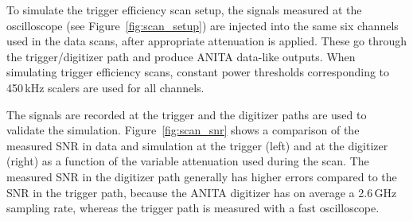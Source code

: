 
To simulate the trigger efficiency scan setup, the signals
measured at the oscilloscope (see Figure~\ref{fig:scan_setup}) are
injected into the same six channels used in the data scans, after
appropriate attenuation is applied.
These go through the trigger/digitizer path and produce ANITA
data-like outputs.
When simulating trigger efficiency scans, constant power
thresholds corresponding to 450\,kHz scalers are used for all channels.

The signals are recorded at the trigger and the digitizer paths
are used to validate the simulation.
Figure~\ref{fig:scan_snr} shows a comparison of the measured SNR in
data and simulation at the trigger (left) and at
the digitizer (right) as a function of the variable attenuation used
during the scan.
The measured SNR in the digitizer path generally has higher errors compared to the SNR in the trigger path, because the ANITA digitizer has on average a
2.6\,GHz sampling rate, whereas the trigger path is measured with a
fast oscilloscope. 

